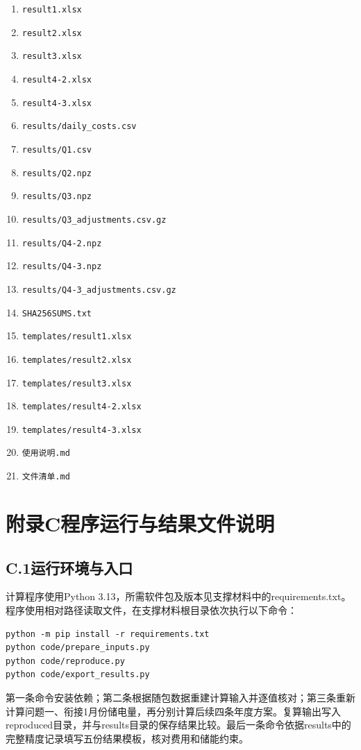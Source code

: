 \begin{enumerate}[label=\arabic*.,leftmargin=2.5em,itemsep=2pt]
\item \texttt{result1.xlsx}
\item \texttt{result2.xlsx}
\item \texttt{result3.xlsx}
\item \texttt{result4-2.xlsx}
\item \texttt{result4-3.xlsx}
\item \texttt{results/\allowbreak{}daily\_\allowbreak{}costs.csv}
\item \texttt{results/\allowbreak{}Q1.csv}
\item \texttt{results/\allowbreak{}Q2.npz}
\item \texttt{results/\allowbreak{}Q3.npz}
\item \texttt{results/\allowbreak{}Q3\_\allowbreak{}adjustments.csv.gz}
\item \texttt{results/\allowbreak{}Q4-2.npz}
\item \texttt{results/\allowbreak{}Q4-3.npz}
\item \texttt{results/\allowbreak{}Q4-3\_\allowbreak{}adjustments.csv.gz}
\item \texttt{SHA256SUMS.txt}
\item \texttt{templates/\allowbreak{}result1.xlsx}
\item \texttt{templates/\allowbreak{}result2.xlsx}
\item \texttt{templates/\allowbreak{}result3.xlsx}
\item \texttt{templates/\allowbreak{}result4-2.xlsx}
\item \texttt{templates/\allowbreak{}result4-3.xlsx}
\item \texttt{使用说明.md}
\item \texttt{文件清单.md}
\end{enumerate}
\endgroup

\bigskip
\section*{附录C\quad 程序运行与结果文件说明}
\subsection*{C.1\quad 运行环境与入口}
计算程序使用Python 3.13，所需软件包及版本见支撑材料中的requirements.txt。程序使用相对路径读取文件，在支撑材料根目录依次执行以下命令：
\begin{Verbatim}[fontsize=\small,frame=single,xleftmargin=8pt,xrightmargin=8pt]
python -m pip install -r requirements.txt
python code/prepare_inputs.py
python code/reproduce.py
python code/export_results.py
\end{Verbatim}
第一条命令安装依赖；第二条根据随包数据重建计算输入并逐值核对；第三条重新计算问题一、衔接1月份储电量，再分别计算后续四条年度方案。复算输出写入reproduced目录，并与results目录的保存结果比较。最后一条命令依据results中的完整精度记录填写五份结果模板，核对费用和储能约束。

